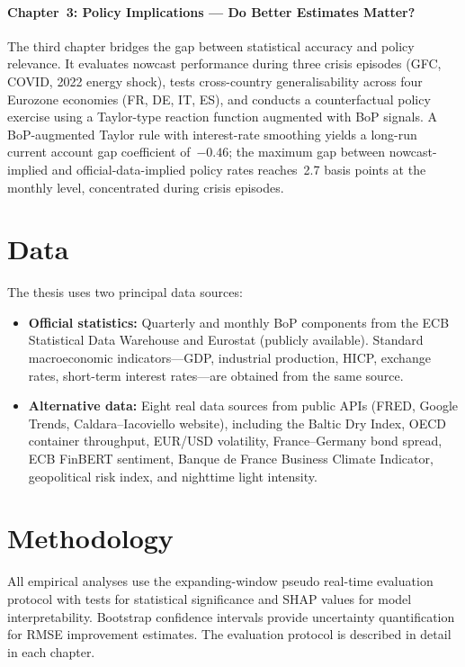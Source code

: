 \paragraph{Chapter~3: Policy Implications --- Do Better Estimates Matter?}
The third chapter bridges the gap between statistical accuracy and policy relevance.  It evaluates nowcast performance during three crisis episodes (GFC, COVID, 2022 energy shock), tests cross-country generalisability across four Eurozone economies (FR, DE, IT, ES), and conducts a counterfactual policy exercise using a Taylor-type reaction function augmented with BoP signals.  A BoP-augmented Taylor rule with interest-rate smoothing yields a long-run current account gap coefficient of~$-0.46$; the maximum gap between nowcast-implied and official-data-implied policy rates reaches~2.7 basis points at the monthly level, concentrated during crisis episodes.


\section*{Data}

The thesis uses two principal data sources:
\begin{itemize}
  \item \textbf{Official statistics:} Quarterly and monthly BoP components from the ECB Statistical Data Warehouse and Eurostat (publicly available).  Standard macroeconomic indicators---GDP, industrial production, HICP, exchange rates, short-term interest rates---are obtained from the same source.
  \item \textbf{Alternative data:} Eight real data sources from public APIs (FRED, Google Trends, Caldara--Iacoviello website), including the Baltic Dry Index, OECD container throughput, EUR/USD volatility, France--Germany bond spread, ECB FinBERT sentiment, Banque de France Business Climate Indicator, geopolitical risk index, and nighttime light intensity.
\end{itemize}


\section*{Methodology}

All empirical analyses use the expanding-window pseudo real-time evaluation protocol with \citet{diebold1995comparing} tests for statistical significance and \citet{lundberg2017unified} SHAP values for model interpretability.  Bootstrap confidence intervals \citep{efron1979bootstrap, kunsch1989jackknife} provide uncertainty quantification for RMSE improvement estimates.  The evaluation protocol is described in detail in each chapter.
